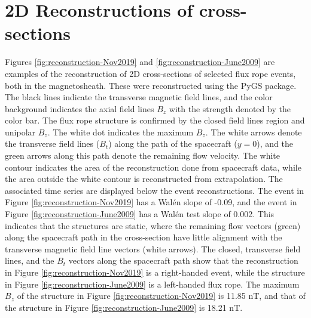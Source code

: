 \section{2D Reconstructions of cross-sections}
Figures \ref{fig:reconstruction-Nov2019} and \ref{fig:reconstruction-June2009} are examples of the reconstruction of 2D cross-sections of selected flux rope events, both in the magnetosheath. These were reconstructed using the PyGS package. The black lines indicate the transverse magnetic field lines, and the color background indicates the axial field lines $B_z$ with the strength denoted by the color bar. The flux rope structure is confirmed by the closed field lines region and unipolar $B_z$. The white dot indicates the maximum $B_z$. The white arrows denote the transverse field lines ($B_t$) along the path of the spacecraft ($y=0$), and the green arrows along this path denote the remaining flow velocity. The white contour indicates the area of the reconstruction done from spacecraft data, while the area outside the white contour is reconstructed from extrapolation. The associated time series are displayed below the event reconstructions. The event in Figure \ref{fig:reconstruction-Nov2019} has a Wal\'en slope of -0.09, and the event in Figure \ref{fig:reconstruction-June2009} has a Wal\'en test slope of 0.002. This indicates that the structures are static, where the remaining flow vectors (green) along the spacecraft path in the cross-section have little alignment with the transverse magnetic field line vectors (white arrows). The closed, transverse field lines, and the $B_t$ vectors along the spacecraft path show that the reconstruction in Figure \ref{fig:reconstruction-Nov2019} is a right-handed event, while the structure in Figure \ref{fig:reconstruction-June2009} is a left-handed flux rope. The maximum $B_z$ of the structure in Figure \ref{fig:reconstruction-Nov2019} is 11.85 nT, and that of the structure in Figure \ref{fig:reconstruction-June2009} is 18.21 nT.

